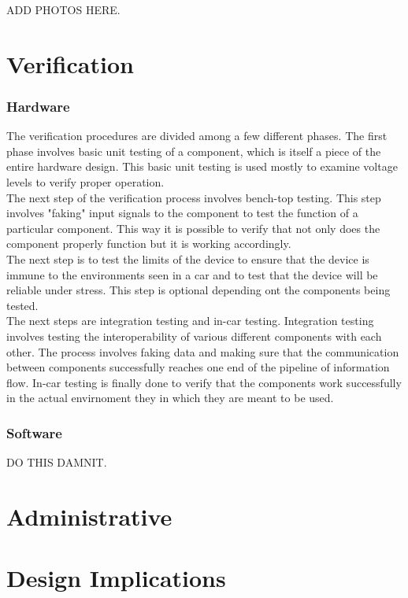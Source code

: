 \documentclass[12pt,letterpaper]{article}
\begin{document}
ADD PHOTOS HERE.

\section{Verification}
\subsubsection{Hardware}
The verification procedures are divided among a few different phases. The first phase involves basic unit testing of a component, which is itself a piece of the entire hardware design. This basic unit testing is used mostly to examine voltage levels to verify proper operation. \\

The next step of the verification process involves bench-top testing. This step involves "faking" input signals to the component to test the function of a particular component. This way it is possible to verify that not only does the component properly function but it is working accordingly. \\

The next step is to test the limits of the device to ensure that the device is immune to the environments seen in a car and to test that the device will be reliable under stress. This step is optional depending ont the components being tested. \\

The next steps are integration testing and in-car testing. Integration testing involves testing the interoperability of various different components with each other. The process involves faking data and making sure that the communication between components successfully reaches one end of the pipeline of information flow. In-car testing is finally done to verify that the components work successfully in the actual envirnoment they in which they are meant to be used.

\subsubsection{Software}
DO THIS DAMNIT.

\section{Administrative}


\section{Design Implications}
\end{document}

